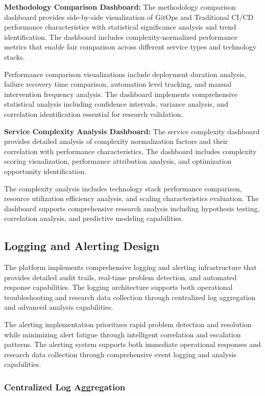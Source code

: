 \textbf{Methodology Comparison Dashboard:}
The methodology comparison dashboard provides side-by-side visualization of GitOps and Traditional CI/CD performance characteristics with statistical significance analysis and trend identification. The dashboard includes complexity-normalized performance metrics that enable fair comparison across different service types and technology stacks.

Performance comparison visualizations include deployment duration analysis, failure recovery time comparison, automation level tracking, and manual intervention frequency analysis. The dashboard implements comprehensive statistical analysis including confidence intervals, variance analysis, and correlation identification essential for research validation.

\textbf{Service Complexity Analysis Dashboard:}
The service complexity dashboard provides detailed analysis of complexity normalization factors and their correlation with performance characteristics. The dashboard includes complexity scoring visualization, performance attribution analysis, and optimization opportunity identification.

The complexity analysis includes technology stack performance comparison, resource utilization efficiency analysis, and scaling characteristics evaluation. The dashboard supports comprehensive research analysis including hypothesis testing, correlation analysis, and predictive modeling capabilities.

\subsection{Logging and Alerting Design}

The platform implements comprehensive logging and alerting infrastructure that provides detailed audit trails, real-time problem detection, and automated response capabilities. The logging architecture supports both operational troubleshooting and research data collection through centralized log aggregation and advanced analysis capabilities.

The alerting implementation prioritizes rapid problem detection and resolution while minimizing alert fatigue through intelligent correlation and escalation patterns. The alerting system supports both immediate operational responses and research data collection through comprehensive event logging and analysis capabilities.

\subsubsection{Centralized Log Aggregation}

